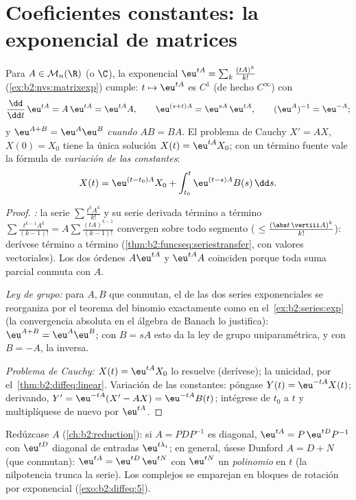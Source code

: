 \section{Coeficientes constantes: la exponencial de matrices}

\begin{theorem}\label{thm:b2:diffeq:matrixexp}
Para $A \in \mathcal{M}_n(\R)$ (o $\C$), la exponencial $\eu^{tA} =
\sum_k \frac{(tA)^k}{k!}$ (\cref{ex:b2:nvs:matrixexp}) cumple: $t
\mapsto \eu^{tA}$ es $C^1$ (de hecho $C^\infty$)
con
\[
\frac{\dd}{\dd t}\,\eu^{tA} = A\,\eu^{tA} = \eu^{tA}A ,
\qquad
\eu^{(s+t)A} = \eu^{sA}\,\eu^{tA},
\qquad
(\eu^{A})^{-1} = \eu^{-A} ;
\]
y $\eu^{A + B} = \eu^A\eu^B$ \emph{cuando} $AB = BA$. El problema de
Cauchy $X' = AX$, $X(0) = X_0$ tiene la única solución $X(t) =
\eu^{tA}X_0$; con un término fuente vale la fórmula de
\emph{variación de las constantes}:
\[
X(t) = \eu^{(t - t_0)A}X_0 + \int_{t_0}^{t} \eu^{(t-s)A}B(s)\,\dd
s .
\]
\end{theorem}

\begin{proof}
\emph{:} la serie $\sum \frac{t^kA^k}{k!}$ y su
serie derivada término a término $\sum \frac{t^{k-1}A^k}{(k-1)!} =
A\sum \frac{(tA)^{k-1}}{(k-1)!}$ convergen  sobre todo
segmento ( $\leq \frac{(\abs t\,\vertiii A)^k}{k!}$): derívese
término a término (\cref{thm:b2:funcseq:seriestransfer}, con valores
vectoriales). Los dos órdenes $A\eu^{tA}$ y $\eu^{tA}A$ coinciden
porque toda suma parcial conmuta con $A$.

\emph{Ley de grupo:} para $A, B$ que conmutan, el
 de las dos series exponenciales se reorganiza por
el teorema del binomio exactamente como en el~\cref{ex:b2:series:exp} (la convergencia absoluta en el álgebra de
Banach lo justifica): $\eu^{A+B} = \eu^A\eu^B$; con $B = sA$ esto da
la ley de grupo uniparamétrica, y con $B = -A$, la inversa.

\emph{Problema de Cauchy:} $X(t) = \eu^{tA}X_0$ lo resuelve
(derívese); la unicidad, por el~\cref{thm:b2:diffeq:linear}.
Variación de las constantes: póngase $Y(t) = \eu^{-tA}X(t)$;
derivando, $Y' = \eu^{-tA}(X' - AX) = \eu^{-tA}B(t)$; intégrese de
$t_0$ a $t$ y multiplíquese de nuevo por $\eu^{tA}$.
\end{proof}

\begin{method}[Calcular $\eu^{tA}$]\label{met:b2:diffeq:computeexp}
Redúzcase $A$ (\cref{ch:b2:reduction}): si $A = PDP^{-1}$ es
diagonal, $\eu^{tA} = P\,\eu^{tD}P^{-1}$ con $\eu^{tD}$ diagonal de
entradas $\eu^{t\lambda_i}$; en general, úsese Dunford $A = D + N$
(que conmutan): $\eu^{tA} = \eu^{tD}\,\eu^{tN}$ con $\eu^{tN}$ un
\emph{polinomio} en $t$ (la nilpotencia trunca la serie). Los
 complejos se emparejan en bloques de rotación por
exponencial (\cref{exo:b2:diffeq:5}).
\end{method}

